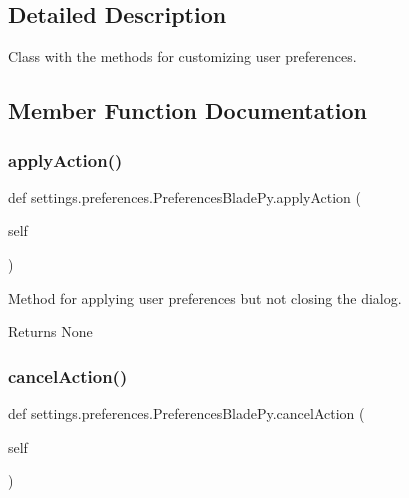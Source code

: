\subsection{Detailed Description}
Class with the methods for customizing user preferences. 

\subsection{Member Function Documentation}
\hypertarget{a00103_a8938a7b43ca7c5496a0ae7bf8d6a0c54}{}\label{a00103_a8938a7b43ca7c5496a0ae7bf8d6a0c54} 
\subsubsection{\texorpdfstring{apply\+Action()}{applyAction()}}
{\footnotesize\ttfamily def settings.\+preferences.\+Preferences\+Blade\+Py.\+apply\+Action (\begin{DoxyParamCaption}\item[{}]{self }\end{DoxyParamCaption})}



Method for applying user preferences but not closing the dialog. 

\begin{DoxyReturn}{Returns}
None 
\end{DoxyReturn}
\hypertarget{a00103_af92de31fcc110a9892dc2914efb6b46f}{}\label{a00103_af92de31fcc110a9892dc2914efb6b46f} 
\subsubsection{\texorpdfstring{cancel\+Action()}{cancelAction()}}
{\footnotesize\ttfamily def settings.\+preferences.\+Preferences\+Blade\+Py.\+cancel\+Action (\begin{DoxyParamCaption}\item[{}]{self }\end{DoxyParamCaption})}



